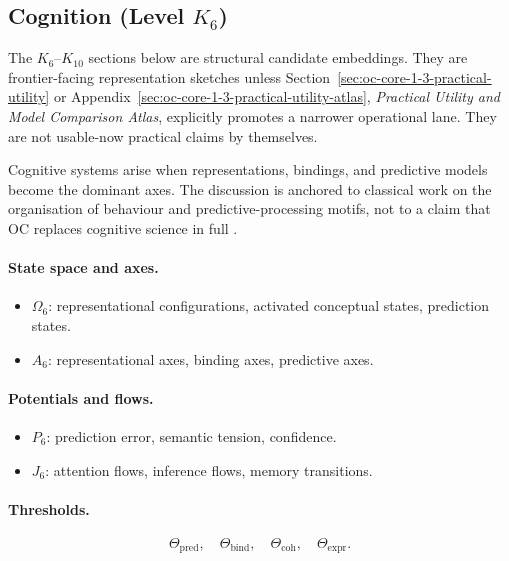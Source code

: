 \subsection{Cognition (Level \texorpdfstring{$K_6$}{K6})}

The \(K_6\)--\(K_{10}\) sections below are structural candidate embeddings.
They are frontier-facing representation sketches unless
Section~\ref{sec:oc-core-1-3-practical-utility} or
Appendix~\ref{sec:oc-core-1-3-practical-utility-atlas}, \emph{Practical
Utility and Model Comparison Atlas}, explicitly promotes a
narrower operational lane. They are not usable-now practical claims by
themselves.

Cognitive systems arise when representations, bindings, and predictive models
become the dominant axes.
The discussion is anchored to classical work on the organisation of behaviour and
predictive-processing motifs, not to a claim that OC replaces cognitive
science in full \parencite{hebb_organization,friston_free_energy}.

\paragraph{State space and axes.}
\begin{itemize}
  \item \(\Omega_6\): representational configurations, activated conceptual
        states, prediction states.
  \item \(A_6\): representational axes, binding axes, predictive axes.
\end{itemize}

\paragraph{Potentials and flows.}
\begin{itemize}
  \item \(P_6\): prediction error, semantic tension, confidence.
  \item \(J_6\): attention flows, inference flows, memory transitions.
\end{itemize}

\paragraph{Thresholds.}
\[
  \Theta_{\mathrm{pred}},\quad
  \Theta_{\mathrm{bind}},\quad
  \Theta_{\mathrm{coh}},\quad
  \Theta_{\mathrm{expr}}.
\]

